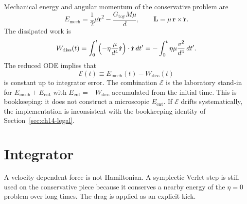Mechanical energy and angular momentum of the conservative problem
are
\begin{equation}
  \label{eq:Emech}
  E_{\mathrm{mech}}
  =\frac12\mu\dot{\mathbf{r}}^{2}
   -\frac{G_{\mathrm{toy}}M\mu}{d},
  \qquad
  \mathbf{L}
  =\mu\,\mathbf{r}\times\dot{\mathbf{r}}.
\end{equation}
The dissipated work is
\begin{equation}
  \label{eq:Wdiss-num}
  W_{\mathrm{diss}}(t)
  =\int_0^t
   \Bigl(
     -\eta\frac{\mu}{d^{4}}\dot{\mathbf{r}}
   \Bigr)
   \cdot\dot{\mathbf{r}}\,dt'
  =-\int_0^t\eta\mu\frac{v^{2}}{d^{4}}\,dt'.
\end{equation}
The reduced ODE implies that
\begin{equation}
  \label{eq:balance-num}
  \mathcal{E}(t)
  \equiv
  E_{\mathrm{mech}}(t)-W_{\mathrm{diss}}(t)
\end{equation}
is constant up to integrator error. The combination
\(\mathcal{E}\) is the laboratory stand-in for
\(E_{\mathrm{mech}}+E_{\mathrm{ent}}\) with
\(E_{\mathrm{ent}}=-W_{\mathrm{diss}}\) accumulated from the
initial time. This is bookkeeping: it does not construct a
microscopic \(E_{\mathrm{ent}}\). If \(\mathcal{E}\) drifts
systematically, the implementation is inconsistent with the
bookkeeping identity of Section~\ref{sec:ch14-legal}.

\section{Integrator}
\label{sec:ch15-verlet}

A velocity-dependent force is not Hamiltonian. A symplectic
Verlet step is still used on the conservative piece because it
conserves a nearby energy of the \(\eta=0\) problem over long
times. The drag is applied as an explicit kick.

